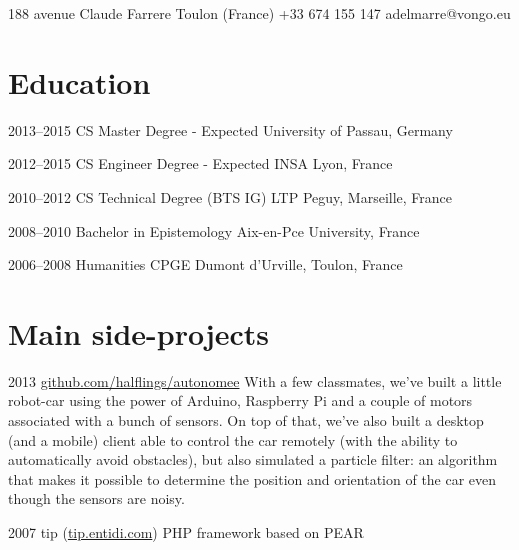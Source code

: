 \documentclass{tccv}
\begin{document}
\personal
    {188 avenue Claude Farrere  Toulon (France)}
    {+33 674 155 147}
    {adelmarre@vongo.eu}

\section{Education}

\begin{yearlist}

\item{2013--2015}
     {CS Master Degree - Expected}
     {University of Passau, Germany}
     
\item{2012--2015}
     {CS Engineer Degree - Expected}
     {INSA Lyon, France}
     
\item{2010--2012}
     {CS Technical Degree (BTS IG)}
     {LTP Peguy, Marseille, France}
     
\item{2008--2010}
     {Bachelor in Epistemology}
     {Aix-en-Pce University, France}
     
\item{2006--2008}
     {Humanities CPGE}
     {Dumont d'Urville, Toulon, France}

\end{yearlist}

\section{Main side-projects}

\begin{yearlist}

\item{2013}
     {\href{https://github.com/halflings/autonomee}{github.com/halflings/autonomee}}
     {With a few classmates, we've built a little robot-car using the power of Arduino, Raspberry Pi and a couple of motors associated with a bunch of sensors. On top of that, we've also built a desktop (and a mobile) client able to control the car remotely (with the ability to automatically avoid obstacles), but also simulated a particle filter: an algorithm that makes it possible to determine the position and orientation of the car even though the sensors are noisy.}

\item{2007}
     {tip (\href{http://tip.entidi.com/}{tip.entidi.com})}
     {PHP framework based on PEAR}

\end{yearlist}
\end{document}
